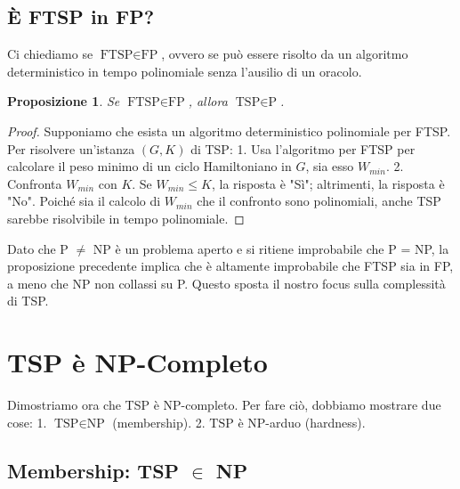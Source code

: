 \documentclass[a4paper, 11pt]{book} %
\newtheorem{proposition}[theorem]{Proposizione}
\theoremstyle{definition}
\begin{document}
\subsection{È FTSP in FP?}

Ci chiediamo se $\text{FTSP} \in \text{FP}$, ovvero se può essere risolto da un algoritmo deterministico in tempo polinomiale senza l'ausilio di un oracolo.

\begin{proposition}
Se $\text{FTSP} \in \text{FP}$, allora $\text{TSP} \in \text{P}$.
\end{proposition}
\begin{proof}
Supponiamo che esista un algoritmo deterministico polinomiale per FTSP. Per risolvere un'istanza $(G, K)$ di TSP:
1.  Usa l'algoritmo per FTSP per calcolare il peso minimo di un ciclo Hamiltoniano in $G$, sia esso $W_{min}$.
2.  Confronta $W_{min}$ con $K$. Se $W_{min} \le K$, la risposta è "Sì"; altrimenti, la risposta è "No".
Poiché sia il calcolo di $W_{min}$ che il confronto sono polinomiali, anche TSP sarebbe risolvibile in tempo polinomiale.
\end{proof}

Dato che P $\neq$ NP è un problema aperto e si ritiene improbabile che P = NP, la proposizione precedente implica che è altamente improbabile che FTSP sia in FP, a meno che NP non collassi su P. Questo sposta il nostro focus sulla complessità di TSP.

\section{TSP è NP-Completo}

Dimostriamo ora che TSP è NP-completo. Per fare ciò, dobbiamo mostrare due cose:
1.  $\text{TSP} \in \text{NP}$ (membership).
2.  $\text{TSP}$ è $\text{NP}$-arduo (hardness).

\subsection{Membership: TSP $\in$ NP}
\end{document}
